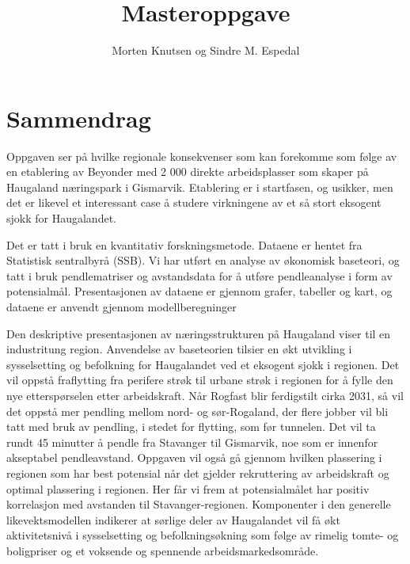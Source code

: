 \documentclass[
]{article}
\title{Masteroppgave}
\author{Morten Knutsen og Sindre M. Espedal}
\date{}
\begin{document}
\maketitle
\ifdefined\Shaded\renewenvironment{Shaded}{\begin{tcolorbox}[breakable, boxrule=0pt, borderline west={3pt}{0pt}{shadecolor}, enhanced, frame hidden, sharp corners, interior hidden]}{\end{tcolorbox}}\fi



\newpage
{}

\hypertarget{sammendrag}{%
\section*{Sammendrag}\label{sammendrag}}

Oppgaven ser på hvilke regionale konsekvenser som kan forekomme som
følge av en etablering av Beyonder med 2 000 direkte arbeidsplasser som
skaper på Haugaland næringspark i Gismarvik. Etablering er i startfasen,
og usikker, men det er likevel et interessant case å studere virkningene
av et så stort eksogent sjokk for Haugalandet.

Det er tatt i bruk en kvantitativ forskningsmetode. Dataene er hentet
fra Statistisk sentralbyrå (SSB). Vi har utført en analyse av økonomisk
baseteori, og tatt i bruk pendlematriser og avstandsdata for å utføre
pendleanalyse i form av potensialmål. Presentasjonen av dataene er
gjennom grafer, tabeller og kart, og dataene er anvendt gjennom
modellberegninger

Den deskriptive presentasjonen av næringsstrukturen på Haugaland viser
til en industritung region. Anvendelse av baseteorien tilsier en økt
utvikling i sysselsetting og befolkning for Haugalandet ved et eksogent
sjokk i regionen. Det vil oppstå fraflytting fra perifere strøk til
urbane strøk i regionen for å fylle den nye etterspørselen etter
arbeidskraft. Når Rogfast blir ferdigstilt cirka 2031, så vil det oppstå
mer pendling mellom nord- og sør-Rogaland, der flere jobber vil bli tatt
med bruk av pendling, i stedet for flytting, som før tunnelen. Det vil
ta rundt 45 minutter å pendle fra Stavanger til Gismarvik, noe som er
innenfor akseptabel pendleavstand. Oppgaven vil også gå gjennom hvilken
plassering i regionen som har best potensial når det gjelder
rekruttering av arbeidskraft og optimal plassering i regionen. Her får
vi frem at potensialmålet har positiv korrelasjon med avstanden til
Stavanger-regionen. Komponenter i den generelle likevektsmodellen
indikerer at sørlige deler av Haugalandet vil få økt aktivitetsnivå i
sysselsetting og befolkningsøkning som følge av rimelig tomte- og
boligpriser og et voksende og spennende arbeidsmarkedsområde.
\end{document}

